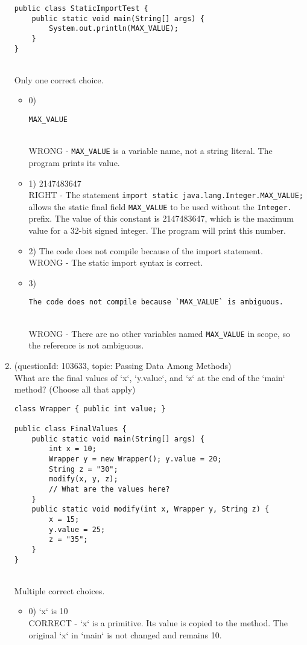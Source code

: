\documentclass[12pt]{article}
\begin{document}
\begin{enumerate}[label=(\arabic*)]
\begin{verbatim}
public class StaticImportTest {
    public static void main(String[] args) {
        System.out.println(MAX_VALUE);
    }
}
\end{verbatim}
\\ \noindent Only one correct choice. 
\begin{itemize}
\item 0) \begin{verbatim}MAX_VALUE\end{verbatim}
 \\ 
WRONG - \verb|MAX_VALUE| is a variable name, not a string literal. The program prints its value.

\item 1) 2147483647
 \\ 
RIGHT - The statement \verb|import static java.lang.Integer.MAX_VALUE;| allows the static final field \verb|MAX_VALUE| to be used without the \verb|Integer.| prefix. The value of this constant is 2147483647, which is the maximum value for a 32-bit signed integer. The program will print this number.

\item 2) The code does not compile because of the import statement.
 \\ 
WRONG - The static import syntax is correct.

\item 3) \begin{verbatim}The code does not compile because `MAX_VALUE` is ambiguous.\end{verbatim}
 \\ 
WRONG - There are no other variables named \verb|MAX_VALUE| in scope, so the reference is not ambiguous.

\end{itemize}
\item (questionId: 103633, topic: Passing Data Among Methods) \\ 
What are the final values of `x`, `y.value`, and `z` at the end of the `main` method? (Choose all that apply)
\begin{verbatim}
class Wrapper { public int value; }

public class FinalValues {
    public static void main(String[] args) {
        int x = 10;
        Wrapper y = new Wrapper(); y.value = 20;
        String z = "30";
        modify(x, y, z);
        // What are the values here?
    }
    public static void modify(int x, Wrapper y, String z) {
        x = 15;
        y.value = 25;
        z = "35";
    }
}
\end{verbatim}
\\ \noindent Multiple correct choices. 
\begin{itemize}
\item 0) `x` is 10
 \\ 
CORRECT - `x` is a primitive. Its value is copied to the method. The original `x` in `main` is not changed and remains 10.


\end{itemize}
\end{enumerate}
\end{document}
